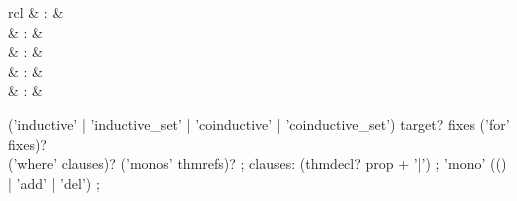 \begin{isabellebody}
\begin{isamarkuptext}
  \begin{matharray}{rcl}
    \hypertarget{command.HOL.inductive}{\hyperlink{command.HOL.inductive}{\mbox{}}} & : &  \\
    \hypertarget{command.HOL.inductive-set}{\hyperlink{command.HOL.inductive-set}{\mbox{}}} & : &  \\
    \hypertarget{command.HOL.coinductive}{\hyperlink{command.HOL.coinductive}{\mbox{}}} & : &  \\
    \hypertarget{command.HOL.coinductive-set}{\hyperlink{command.HOL.coinductive-set}{\mbox{}}} & : &  \\
    \hypertarget{attribute.HOL.mono}{\hyperlink{attribute.HOL.mono}{\mbox{}}} & : &  \\
  \end{matharray}

  \begin{rail}
    ('inductive' | 'inductive_set' | 'coinductive' | 'coinductive_set') target? fixes ('for' fixes)? \\
    ('where' clauses)? ('monos' thmrefs)?
    ;
    clauses: (thmdecl? prop + '|')
    ;
    'mono' (() | 'add' | 'del')
    ;
  \end{rail}


\end{isamarkuptext}
\end{isabellebody}
